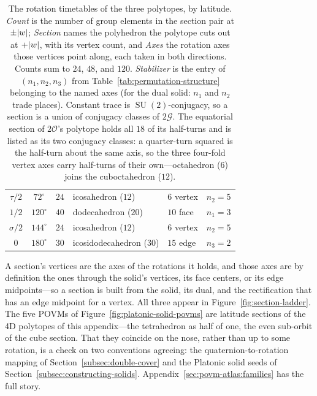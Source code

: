 \documentclass[11pt, oneside, openany]{scrbook}
\DeclareMathOperator{\SU}{SU}
\newcommand{\Ogroup}{\mathcal{O}}  %
\newcommand{\Ggroup}{\mathcal{G}}
\newcommand{\TwoO}{2\Ogroup}
\newcommand{\TwoG}{2\Ggroup}
\newcommand{\phig}{\tau} %
\newcommand{\invphig}{\sigma} %
\DeclarePairedDelimiter{\abs}{\lvert}{\rvert}
\begin{document}
\begin{table}[h]
\begin{tabular}{cccllc}
$\phig/2$    & $72^\circ$  & $24$ & icosahedron ($12$)       & $6$ vertex        & $n_2 = 5$ \\
$1/2$        & $120^\circ$ & $40$ & dodecahedron ($20$)      & $10$ face         & $n_1 = 3$ \\
$\invphig/2$ & $144^\circ$ & $24$ & icosahedron ($12$)       & $6$ vertex        & $n_2 = 5$ \\
$0$          & $180^\circ$ & $30$ & icosidodecahedron ($30$) & $15$ edge         & $n_3 = 2$ \\
\bottomrule
\end{tabular}
\caption{The rotation timetables of the three polytopes, by latitude. \textit{Count} is the number of group elements in the section pair at $\pm\abs{w}$; \textit{Section} names the polyhedron the polytope cuts out at $+\abs{w}$, with its vertex count, and \textit{Axes} the rotation axes those vertices point along, each taken in both directions. Counts sum to $24$, $48$, and $120$. \textit{Stabilizer} is the entry of $(n_1, n_2, n_3)$ from Table~\ref{tab:permutation-structure} belonging to the named axes (for the dual solid: $n_1$ and $n_2$ trade places). Constant trace is $\SU(2)$-conjugacy, so a section is a union of conjugacy classes of $\TwoG$. The equatorial section of $\TwoO$'s polytope holds all $18$ of its half-turns and is listed as its two conjugacy classes: a quarter-turn squared is the half-turn about the same axis, so the three four-fold vertex axes carry half-turns of their own---octahedron ($6$) joins the cuboctahedron ($12$).}
\label{tab:rotation-sections}
\end{table}

A section's vertices are the axes of the rotations it holds, and those axes are by definition the ones through the solid's vertices, its face centers, or its edge midpoints---so a section is built from the solid, its dual, and the rectification that has an edge midpoint for a vertex. All three appear in Figure~\ref{fig:section-ladder}. The five POVMs of Figure~\ref{fig:platonic-solid-povms} are latitude sections of the 4D polytopes of this appendix---the tetrahedron as half of one, the even sub-orbit of the cube section. That they coincide on the nose, rather than up to some rotation, is a check on two conventions agreeing: the quaternion-to-rotation mapping of Section~\ref{subsec:double-cover} and the Platonic solid seeds of Section~\ref{subsec:constructing-solids}. Appendix~\ref{sec:povm-atlas:families} has the full story.
\end{document}

